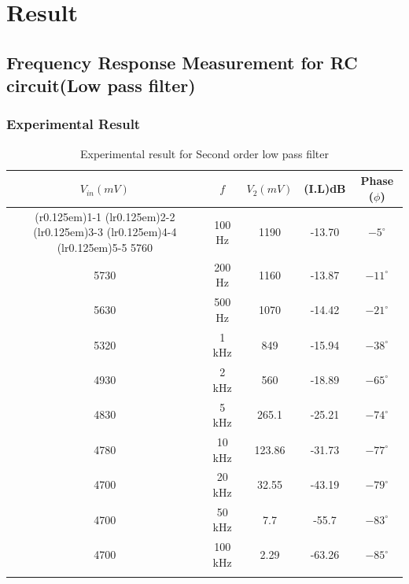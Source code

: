 \documentclass[a4paper, 12pt, english]{article}
\newcommand{\myrowcolour}{\rowcolor[gray]{0.925}}
\begin{document}
\null\newpage
\section{Result}


\subsection{Frequency Response Measurement for RC circuit(Low pass filter)}

	\subsubsection{Experimental Result}
        \begin{table}[!ht]
        \caption{\label{tab:Table 1} Experimental result for Second order low pass filter}
        \centering
        \begin{tabular}{c c c c c}           
         \toprule        
            \textbf{$ V_{in} (mV)$}
  		& \textbf{$ f $}
  		& \textbf{$V_{2} (mV)$}
  		& \textbf{(I.L)dB}
  		& \textbf{Phase ($\phi $)} \\      
        \cmidrule[0.4pt](r{0.125em}){1-1}%
		\cmidrule[0.4pt](lr{0.125em}){2-2}%
		\cmidrule[0.4pt](lr{0.125em}){3-3}%
		\cmidrule[0.4pt](lr{0.125em}){4-4}%
		\cmidrule[0.4pt](lr{0.125em}){5-5}%
        	5760 & 100 Hz & 1190 & -13.70 & $-5^{\circ}$ \\
 			\myrowcolour%
 			5730 & 200 Hz & 1160& -13.87 & $-11^{\circ}$ \\
 			5630 & 500 Hz & 1070 & -14.42 & $-21^{\circ}$ \\
 			\myrowcolour%
 			5320 & 1 kHz & 849 & -15.94 & $-38^{\circ}$ \\
 			4930 & 2 kHz & 560 & -18.89 & $-65^{\circ}$ \\
 			\myrowcolour%
 			4830 & 5 kHz & 265.1 & -25.21 & $-74^{\circ}$ \\
 			4780 & 10 kHz & 123.86 & -31.73 & $-77^{\circ}$ \\
 			\myrowcolour%
 			4700 & 20 kHz & 32.55 & -43.19 & $-79^{\circ}$ \\
 			4700 & 50 kHz & 7.7 & -55.7 & $-83^{\circ}$ \\
 			\myrowcolour%
 			4700 & 100 kHz & 2.29 & -63.26 & $-85^{\circ}$ \\
        \bottomrule\\      
        \end{tabular}
        \end{table}
\end{document}
